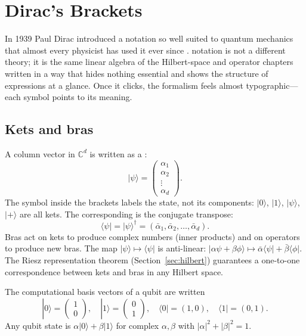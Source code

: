 \chapter{Dirac's Brackets}


In 1939 Paul Dirac introduced a notation so well suited to quantum mechanics that almost every physicist has used it ever since \citep{dirac_principles_1958}.  notation is not a different theory; it is the same linear algebra of the Hilbert-space and operator chapters written in a way that hides nothing essential and shows the structure of expressions at a glance. Once it clicks, the formalism feels almost typographic---each symbol points to its meaning.

\section{Kets and bras}

A column vector in $\mathbb{C}^d$ is written as a :
\[
  |\psi\rangle = \begin{pmatrix} \alpha_1 \\ \alpha_2 \\ \vdots \\ \alpha_d \end{pmatrix}.
\]
The symbol inside the brackets labels the state, not its components: $|0\rangle$, $|1\rangle$, $|\psi\rangle$, $|+\rangle$ are all kets. The corresponding  is the conjugate transpose:
\[
  \langle\psi| = |\psi\rangle^\dagger = (\bar\alpha_1, \bar\alpha_2, \ldots, \bar\alpha_d).
\]
Bras act on kets to produce complex numbers (inner products) and on operators to produce new bras. The map $|\psi\rangle \mapsto \langle\psi|$ is anti-linear: $|\alpha\psi+\beta\phi\rangle \mapsto \bar\alpha\langle\psi| + \bar\beta\langle\phi|$. The Riesz representation theorem (Section~\ref{sec:hilbert}) guarantees a one-to-one correspondence between kets and bras in any Hilbert space.

\begin{example}
The computational basis vectors of a qubit are written
\[
  |0\rangle = \begin{pmatrix}1\\0\end{pmatrix}, \quad |1\rangle = \begin{pmatrix}0\\1\end{pmatrix}, \quad \langle 0| = (1,0), \quad \langle 1| = (0,1).
\]
Any qubit state is $\alpha|0\rangle + \beta|1\rangle$ for complex $\alpha,\beta$ with $|\alpha|^2+|\beta|^2=1$.
\end{example}

